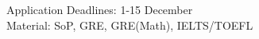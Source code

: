 \noindent Application Deadlines: 1-15 December\\
\noindent Material: SoP, GRE, GRE(Math), IELTS/TOEFL\\
\noindent